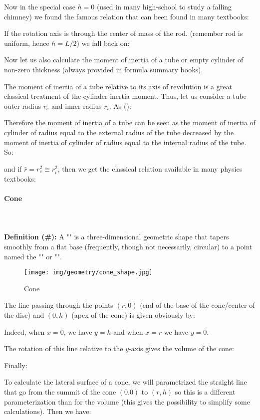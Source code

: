 {	Now in the special case $h=0$ (used in many high-school to study a falling chimney) we found the famous relation that can been found in many textbooks:
	
	If the rotation axis is through the center of mass of the rod. (remember rod is uniform, hence $h=L/2$) we fall back on:
	
	
	Now let us also calculate the moment of inertia of a tube or empty cylinder of non-zero thickness (always provided in formula summary books). 
	
	The moment of inertia of a tube relative to its axis of revolution is a great classical treatment of the cylinder inertia moment. Thus, let us consider a tube outer radius $r_e$ and inner radius $r_i$. As ():
	
	Therefore the moment of inertia of a tube can be seen as the moment of inertia of cylinder of radius equal to the external radius of the tube decreased by the moment of inertia of cylinder of radius equal to the internal radius of the tube. So:
	
	and if $\bar{r}=r_e^2\cong r_i^2$, then we get the classical relation available in many physics textbooks:
	
	
	\pagebreak
	\paragraph{Cone}\mbox{}\\\\
	\textbf{Definition (\#\mydef):} A "" is a three-dimensional geometric shape that tapers smoothly from a flat base (frequently, though not necessarily, circular) to a point named the "" or "".
	\begin{figure}[H]
		\centering
		\texttt{[image: img/geometry/cone\_shape.jpg]}
		\caption{Cone}
	\end{figure}
	The line passing through the points $(r,0)$ (end of the base of the cone/center of the disc) and $(0,h)$ (apex of the cone) is given obviously by:
	
	Indeed, when $x=0$, we have $y=h$ and when $x=r$ we have $y=0$.
	
	The rotation of this line relative to the $y$-axis gives the volume of the cone:
	
	Finally:
	
	To calculate the lateral surface of a cone, we will parametrized the straight line that go from the summit of the cone $(0.0)$ to $(r, h)$ so this is a different parameterization than for the volume (this gives the possibility to simplify some calculations). Then we have:
	
}
